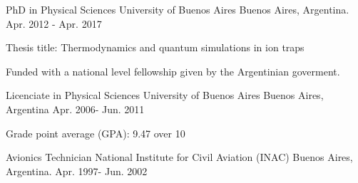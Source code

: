 

\begin{cventries}

  \cventry
    {PhD in Physical Sciences} %
    {University of Buenos Aires} %
    {Buenos Aires, Argentina.} %
    {Apr. 2012 - Apr. 2017} %
    {
      \begin{cvitems} %
        \item {Thesis title: Thermodynamics and quantum simulations in ion traps}
        \item {Funded with a national level fellowship given by the Argentinian
            goverment.}
      \end{cvitems}
    }

  \cventry
    {Licenciate in Physical Sciences} %
    {University of Buenos Aires} %
    {Buenos Aires, Argentina} %
    {Apr. 2006- Jun. 2011} %
    {
      \begin{cvitems} %
        \item {Grade point average (GPA): 9.47 over 10}
      \end{cvitems}
    }

  \cventry
    {Avionics Technician} %
    {National Institute for Civil Aviation (INAC)} %
    {Buenos Aires, Argentina.} %
    {Apr. 1997- Jun. 2002} %
    {
    }


\end{cventries}
